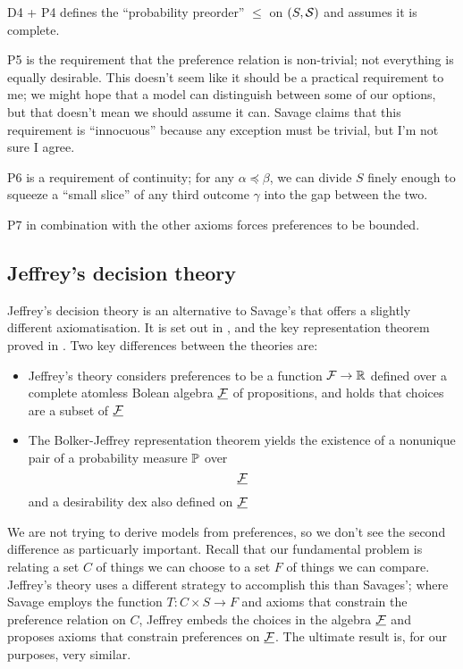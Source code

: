 D4 + P4 defines the ``probability preorder'' $\leqslant$ on $(S,\mathcal{S})$ and assumes it is complete.

P5 is the requirement that the preference relation is non-trivial; not everything is equally desirable. This doesn't seem like it should be a practical requirement to me; we might hope that a model can distinguish between some of our options, but that doesn't mean we should assume it can. Savage claims that this requirement is ``innocuous'' because any exception must be trivial, but I'm not sure I agree.

P6 is a requirement of continuity; for any $\alpha\preceq \beta$, we can divide $S$ finely enough to squeeze a ``small slice'' of any third outcome $\gamma$ into the gap between the two.

P7 in combination with the other axioms forces preferences to be bounded.

\subsection{Jeffrey's decision theory}

Jeffrey's decision theory is an alternative to Savage's that offers a slightly different axiomatisation. It is set out in \citet{jeffrey_logic_1990}, and the key representation theorem proved in \citet{bolker_functions_1966}. Two key differences between the theories are:
\begin{itemize}
    \item Jeffrey's theory considers preferences to be a function $\mathcal{F}\to \mathbb{R}$ defined over a complete atomless Bolean algebra $\underline{\mathcal{F}}$ of propositions, and holds that choices are a subset of $\underline{\mathcal{F}}$
    \item The Bolker-Jeffrey representation theorem yields the existence of a nonunique pair of a probability measure $\mathbb{P}$ over $$\underline{\mathcal{F}}$$ and a desirability $\mathrm{dex}$ also defined on $\underline{\mathcal{F}}$
\end{itemize}

We are not trying to derive models from preferences, so we don't see the second difference as particuarly important. Recall that our fundamental problem is relating a set $C$ of things we can choose to a set $F$ of things we can compare. Jeffrey's theory uses a different strategy to accomplish this than Savages'; where Savage employs the function $T:C\times S\to F$ and axioms that constrain the preference relation on $C$, Jeffrey embeds the choices in the algebra $\underline{\mathcal{F}}$ and proposes axioms that constrain preferences on $\underline{\mathcal{F}}$. The ultimate result is, for our purposes, very similar.

